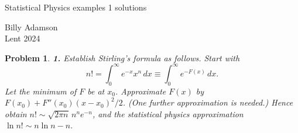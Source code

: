 \documentclass[11pt]{article}
\newtheorem*{problem}{Problem}
\begin{document}
\noindent
\begin{minipage}[t]{0.5\textwidth}
\raggedright
\Large Statistical Physics examples 1 solutions
\end{minipage}%
\begin{minipage}[t]{0.5\textwidth}
\raggedleft
Billy Adamson \\
Lent 2024
\end{minipage}

\vspace{1em}

\begin{problem}
\textbf{1.} Establish Stirling's formula as follows. Start with
\[
n! = \int_0^\infty e^{-x}x^n\,dx \equiv \int_0^\infty e^{-F(x)}\,dx.
\]
Let the minimum of $F$ be at $x_0$. Approximate $F(x)$ by $F(x_0)+F''(x_0)(x-x_0)^2/2$.
(One further approximation is needed.) Hence obtain $n! \sim \sqrt{2\pi n}\,n^n e^{-n}$, and the
statistical physics approximation $\ln n! \sim n\ln n - n$.
\end{problem}
\end{document}
